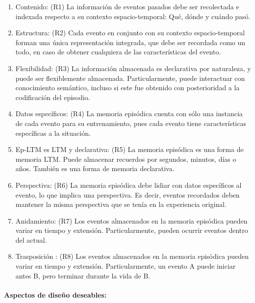 \begin{enumerate}[topsep=0pt]
\setlength\itemsep{0.2em}
\item Contenido: (R1) La información de eventos pasados debe ser recolectada e indexada respecto a su contexto espacio-temporal: Qué, dónde y cuándo pasó.

\item Estructura: (R2) Cada evento en conjunto con su contexto espacio-temporal forman una única representación integrada, que debe ser recordada como un todo, en caso de obtener cualquiera de las características del evento.

\item Flexibilidad: (R3) La información almacenada es declarativa por naturaleza, y puede ser flexiblemente almacenada. Particularmente, puede interactuar con conocimiento semántico, incluso si este fue obtenido con posterioridad a la codificación del episodio.

\item Datos específicos: (R4) La memoria episódica cuenta con sólo una instancia de cada evento para su entrenamiento, pues cada evento tiene características específicas a la situación.

\item Ep-LTM es LTM y declarativa: (R5) La memoria episódica es una forma de memoria LTM. Puede almacenar recuerdos por segundos, minutos, días o años. También es una forma de memoria declarativa.

\item Perspectiva: (R6) La memoria episódica debe lidiar con datos específicos al evento, lo que implica una perspectiva. Es decir, eventos recordados deben mantener la misma perspectiva que se tenía en la experiencia original.

\item Anidamiento: (R7) Los eventos almacenados en la memoria episódica pueden variar en tiempo y extensión. Particularmente, pueden ocurrir eventos dentro del actual.

\item Trasposición : (R8) Los eventos almacenados en la memoria episódica pueden variar en tiempo y extensión. Particularmente, un evento A puede iniciar antes B, pero terminar durante la vida de B.

\end{enumerate}

\paragraph{Aspectos de diseño deseables:}

